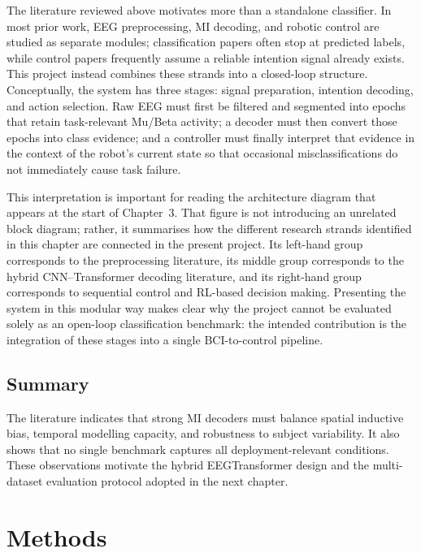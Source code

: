 \documentclass[12pt, a4paper]{article}
\begin{document}
The literature reviewed above motivates more than a standalone classifier. In most prior work, EEG preprocessing, MI decoding, and robotic control are studied as separate modules; classification papers often stop at predicted labels, while control papers frequently assume a reliable intention signal already exists. This project instead combines these strands into a closed-loop structure. Conceptually, the system has three stages: signal preparation, intention decoding, and action selection. Raw EEG must first be filtered and segmented into epochs that retain task-relevant Mu/Beta activity; a decoder must then convert those epochs into class evidence; and a controller must finally interpret that evidence in the context of the robot's current state so that occasional misclassifications do not immediately cause task failure.

This interpretation is important for reading the architecture diagram that appears at the start of Chapter~3. That figure is not introducing an unrelated block diagram; rather, it summarises how the different research strands identified in this chapter are connected in the present project. Its left-hand group corresponds to the preprocessing literature, its middle group corresponds to the hybrid CNN--Transformer decoding literature, and its right-hand group corresponds to sequential control and RL-based decision making. Presenting the system in this modular way makes clear why the project cannot be evaluated solely as an open-loop classification benchmark: the intended contribution is the integration of these stages into a single BCI-to-control pipeline.

\subsection{Summary}

The literature indicates that strong MI decoders must balance spatial inductive bias, temporal modelling capacity, and robustness to subject variability. It also shows that no single benchmark captures all deployment-relevant conditions. These observations motivate the hybrid EEGTransformer design and the multi-dataset evaluation protocol adopted in the next chapter.

\section{Methods}
\end{document}
